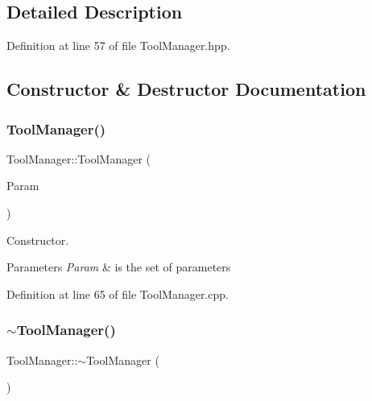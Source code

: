\subsection{Detailed Description}


Definition at line 57 of file Tool\+Manager.\+hpp.



\subsection{Constructor \& Destructor Documentation}
\mbox{\label{classToolManager_a213dc23b5dc57354857053ef0b0c3fa8}} 
\subsubsection{\texorpdfstring{Tool\+Manager()}{ToolManager()}}
{\footnotesize\ttfamily Tool\+Manager\+::\+Tool\+Manager (\begin{DoxyParamCaption}\item[{const \hyperlink{Parameter_8hpp_a37841774a6fcb479b597fdf8955eb4ea}{Parameter\+Const\+Ref} \&}]{Param }\end{DoxyParamCaption})\hspace{0.3cm}{\ttfamily [explicit]}}



Constructor. 


\begin{DoxyParams}{Parameters}
{\em Param} & is the set of parameters \\
\hline
\end{DoxyParams}


Definition at line 65 of file Tool\+Manager.\+cpp.

\mbox{\label{classToolManager_a242d9f322f17b81946a921764ea6c5dd}} 
\subsubsection{\texorpdfstring{$\sim$\+Tool\+Manager()}{~ToolManager()}}
{\footnotesize\ttfamily Tool\+Manager\+::$\sim$\+Tool\+Manager (\begin{DoxyParamCaption}{ }\end{DoxyParamCaption})\hspace{0.3cm}{\ttfamily [virtual]}}



